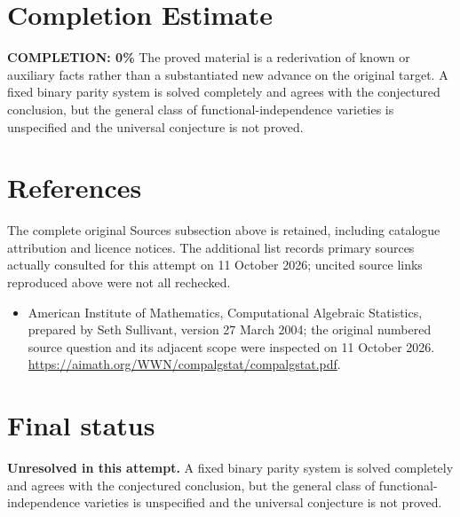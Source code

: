 \documentclass[11pt]{article}
\begin{document}
\section{Completion Estimate}
\noindent\textbf{COMPLETION: 0\%}
The proved material is a rederivation of known or auxiliary facts rather than a substantiated new advance on the original target. A fixed binary parity system is solved completely and agrees with the conjectured conclusion, but the general class of functional-independence varieties is unspecified and the universal conjecture is not proved.
\section{References}
The complete original Sources subsection above is retained, including catalogue attribution and licence notices. The additional list records primary sources actually consulted for this attempt on 11 October 2026; uncited source links reproduced above were not all rechecked.
\begin{itemize}
\item American Institute of Mathematics, Computational Algebraic Statistics, prepared by Seth Sullivant, version 27 March 2004; the original numbered source question and its adjacent scope were inspected on 11 October 2026. \url{https://aimath.org/WWN/compalgstat/compalgstat.pdf}.
\end{itemize}
\section{Final status}
\textbf{Unresolved in this attempt.} A fixed binary parity system is solved completely and agrees with the conjectured conclusion, but the general class of functional-independence varieties is unspecified and the universal conjecture is not proved.
\end{document}
